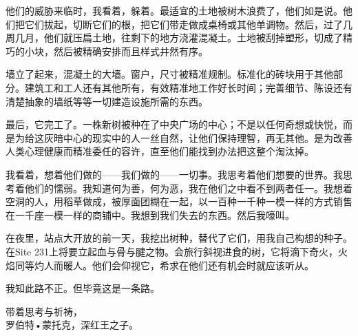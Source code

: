 

\begin{scpbox}

他们的威胁来临时，我看着，躲着。最适宜的土地被树木浪费了，他们如是说。他们把它们拔起，切断它们的根，把它们带走做成桌椅或其他单调物。然后，过了几周几月，他们就压扁土地，往剩下的地方浇灌混凝土。土地被刮掉塑形，切成了精巧的小块，然后被精确安排而且样式井然有序。

墙立了起来，混凝土的大墙。窗户，尺寸被精准规制。标准化的砖块用于其他部分。建筑工和工人还有其他所有，有效精准地工作好长时间；完善细节、陈设还有清楚抽象的墙纸等等一切建造设施所需的东西。

最后，它完工了。一株新树被种在了中央广场的中心；不是以任何奇想或快悦，而是为给这灰暗中心的现实中的人一丝自然，让他们保持理智，再无其他。是为改善人类心理健康而精准委任的容许，直至他们能找到办法把这整个淘汰掉。

我看着，想着他们做的——我们做的——一切事。我思考着他们想要的世界。我思考着他们的懦弱。我知道何为善，何为恶，我在他们之中看不到两者任一。我想着空洞的人，用稻草做成，被厚面团糊在一起，以一百种一千种一模一样的方式销售在一千座一模一样的商铺中。我想到我们失去的东西。然后我嚎叫。

在夜里，站点大开放的前一天，我挖出树种，替代了它们，用我自己构想的种子。在Site 231上将要立起血与骨与腱之物。会旅行斜视进食的树，它将滴下奇火，火焰同等灼人而暖人。他们会仰视它，希求在他们还有机会时就应该听从。

我知此路不正。但毕竟这是一条路。

带着思考与祈祷，\\
罗伯特•蒙托克，深红王之子。

\end{scpbox}
